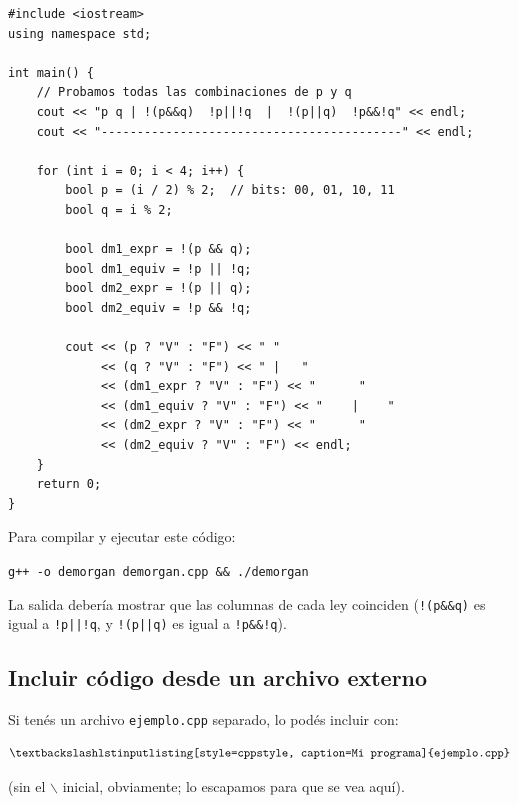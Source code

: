 \begin{lstlisting}[caption={Verificación de las leyes de De Morgan en C++},label={codigo:dcmorgan}]
#include <iostream>
using namespace std;

int main() {
    // Probamos todas las combinaciones de p y q
    cout << "p q | !(p&&q)  !p||!q  |  !(p||q)  !p&&!q" << endl;
    cout << "------------------------------------------" << endl;

    for (int i = 0; i < 4; i++) {
        bool p = (i / 2) % 2;  // bits: 00, 01, 10, 11
        bool q = i % 2;

        bool dm1_expr = !(p && q);
        bool dm1_equiv = !p || !q;
        bool dm2_expr = !(p || q);
        bool dm2_equiv = !p && !q;

        cout << (p ? "V" : "F") << " "
             << (q ? "V" : "F") << " |   "
             << (dm1_expr ? "V" : "F") << "      "
             << (dm1_equiv ? "V" : "F") << "    |    "
             << (dm2_expr ? "V" : "F") << "      "
             << (dm2_equiv ? "V" : "F") << endl;
    }
    return 0;
}
\end{lstlisting}

\begin{observacion}
Para compilar y ejecutar este código:

\texttt{g++ -o demorgan demorgan.cpp \&\& ./demorgan}

La salida debería mostrar que las columnas de cada ley coinciden
(\texttt{!(p\&\&q)} es igual a \texttt{!p||!q}, y \texttt{!(p||q)} es igual a \texttt{!p\&\&!q}).
\end{observacion}

\subsection{Incluir código desde un archivo externo}

Si tenés un archivo \texttt{ejemplo.cpp} separado, lo podés incluir con:

\[
\textbackslash\texttt{lstinputlisting[style=cppstyle, caption=Mi programa]\{ejemplo.cpp\}}
\]

(sin el $\backslash$ inicial, obviamente; lo escapamos para que se vea aquí).


